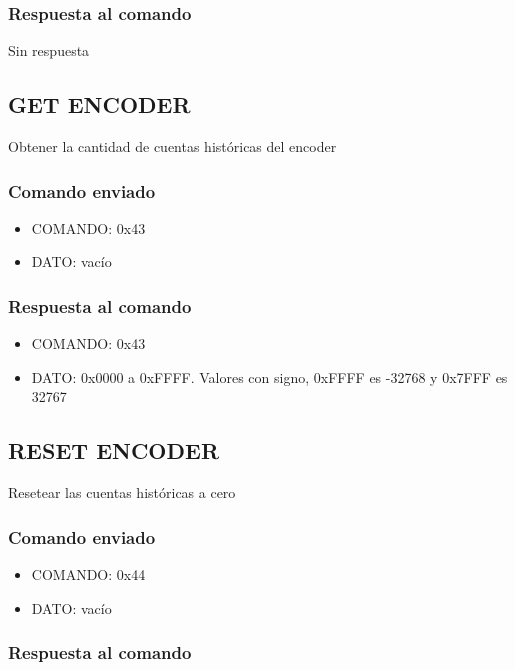 \documentclass[a4paper,10pt]{article}
\begin{document}
\subsubsection*{Respuesta al comando}

Sin respuesta

\subsection{GET ENCODER}
\label{get_encoder}

Obtener la cantidad de cuentas hist\'oricas del encoder

\subsubsection*{Comando enviado}

\begin{itemize}
	\item{COMANDO:} 0x43
	\item{DATO:} vac\'io
\end{itemize}

\subsubsection*{Respuesta al comando}

\begin{itemize}
	\item{COMANDO:} 0x43
	\item{DATO:} 0x0000 a 0xFFFF. Valores con signo, 0xFFFF es -32768 y 0x7FFF es 32767
\end{itemize}

\subsection{RESET ENCODER}
\label{reset_encoder}

Resetear las cuentas hist\'oricas a cero

\subsubsection*{Comando enviado}

\begin{itemize}
	\item{COMANDO:} 0x44
	\item{DATO:} vac\'io
\end{itemize}

\subsubsection*{Respuesta al comando}
\end{document}
